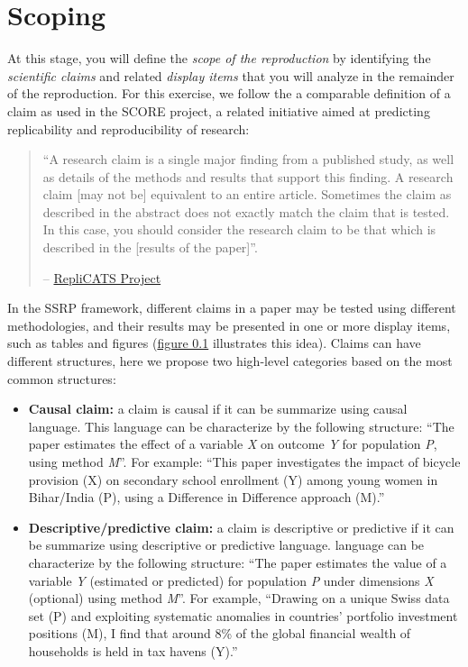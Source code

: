 \documentclass[
  openany]{book}
\begin{document}
\hypertarget{scoping}{%
\chapter{Scoping}\label{scoping}}

At this stage, you will define the \emph{scope of the reproduction} by identifying the \emph{scientific claims} and related \emph{display items} that you will analyze in the remainder of the reproduction. For this exercise, we follow the a comparable definition of a claim as used in the SCORE project, a related initiative aimed at predicting replicability and reproducibility of research:

\begin{quote}
``A research claim is a single major finding from a published study, as well as details of the methods and results that support this finding. A research claim {[}may not be{]} equivalent to an entire article. Sometimes the claim as described in the abstract does not exactly match the claim that is tested. In this case, you should consider the research claim to be that which is described in the {[}results of the paper{]}''.

-- \href{https://replicats.research.unimelb.edu.au/\#tab301}{RepliCATS Project}
\end{quote}

In the SSRP framework, different claims in a paper may be tested using different methodologies, and their results may be presented in one or more display items, such as tables and figures (\protect\hyperlink{fig:diagram}{figure 0.1} illustrates this idea). Claims can have different structures, here we propose two high-level categories based on the most common structures:

\begin{itemize}
\item
  \textbf{Causal claim:} a claim is causal if it can be summarize using causal language. This language can be characterize by the following structure: ``The paper estimates the effect of a variable \emph{X} on outcome \emph{Y} for population \emph{P}, using method \emph{M}''. For example: ``This paper investigates the impact of bicycle provision (X) on secondary school enrollment (Y) among young women in Bihar/India (P), using a Difference in Difference approach (M).''
\item
  \textbf{Descriptive/predictive claim:} a claim is descriptive or predictive if it can be summarize using descriptive or predictive language. language can be characterize by the following structure: ``The paper estimates the value of a variable \emph{Y} (estimated or predicted) for population \emph{P} under dimensions \emph{X} (optional) using method \emph{M}''. For example, ``Drawing on a unique Swiss data set (P) and exploiting systematic anomalies in countries' portfolio investment positions (M), I find that around 8\% of the global financial wealth of households is held in tax havens (Y).''
\end{itemize}
\end{document}
